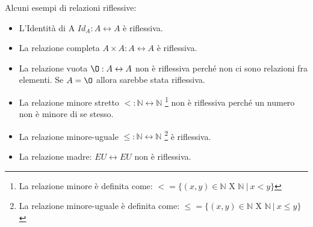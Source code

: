 \begin{example}
Alcuni esempi di relazioni riflessive:
    \begin{itemize}
        \item L'Identità di A $Id_A: A \leftrightarrow A$ è riflessiva.
        \item La relazione completa $A \times A:A \leftrightarrow A$ è riflessiva.
        \item La relazione vuota $\O: A \leftrightarrow A$ non è riflessiva perché non ci sono relazioni fra elementi. Se $A = \O$ allora sarebbe stata riflessiva.
        \item La relazione minore stretto $<: \mathbb{N} \leftrightarrow \mathbb{N}$ \footnote{La relazione minore è definita come: $< = \{(x,y) \in \mathbb{N}$ X $\mathbb{N}\:|\: x < y\}$} non è riflessiva perché un numero non è minore di se stesso.
        \item La relazione minore-uguale $\leq: \mathbb{N} \leftrightarrow \mathbb{N}$ \footnote{La relazione minore-uguale è definita come: $\leq = \{(x,y) \in \mathbb{N}$ X $\mathbb{N}\:|\: x \leq y\}$} è riflessiva.
        \item La relazione madre: $EU \leftrightarrow EU$ non è riflessiva.
    \end{itemize}
\end{example}

\newpage
